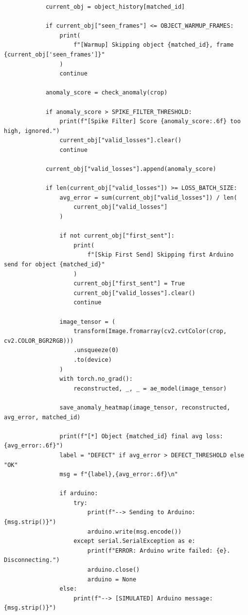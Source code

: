 \begin{verbatim}
            current_obj = object_history[matched_id]

            if current_obj["seen_frames"] <= OBJECT_WARMUP_FRAMES:
                print(
                    f"[Warmup] Skipping object {matched_id}, frame {current_obj['seen_frames']}"
                )
                continue

            anomaly_score = check_anomaly(crop)

            if anomaly_score > SPIKE_FILTER_THRESHOLD:
                print(f"[Spike Filter] Score {anomaly_score:.6f} too high, ignored.")
                current_obj["valid_losses"].clear()
                continue

            current_obj["valid_losses"].append(anomaly_score)

            if len(current_obj["valid_losses"]) >= LOSS_BATCH_SIZE:
                avg_error = sum(current_obj["valid_losses"]) / len(
                    current_obj["valid_losses"]
                )

                if not current_obj["first_sent"]:
                    print(
                        f"[Skip First Send] Skipping first Arduino send for object {matched_id}"
                    )
                    current_obj["first_sent"] = True
                    current_obj["valid_losses"].clear()
                    continue

                image_tensor = (
                    transform(Image.fromarray(cv2.cvtColor(crop, cv2.COLOR_BGR2RGB)))
                    .unsqueeze(0)
                    .to(device)
                )
                with torch.no_grad():
                    reconstructed, _, _ = ae_model(image_tensor)

                save_anomaly_heatmap(image_tensor, reconstructed, avg_error, matched_id)

                print(f"[*] Object {matched_id} final avg loss: {avg_error:.6f}")
                label = "DEFECT" if avg_error > DEFECT_THRESHOLD else "OK"
                msg = f"{label},{avg_error:.6f}\n"

                if arduino:
                    try:
                        print(f"--> Sending to Arduino: {msg.strip()}")
                        arduino.write(msg.encode())
                    except serial.SerialException as e:
                        print(f"ERROR: Arduino write failed: {e}. Disconnecting.")
                        arduino.close()
                        arduino = None
                else:
                    print(f"--> [SIMULATED] Arduino message: {msg.strip()}")


\end{verbatim}
